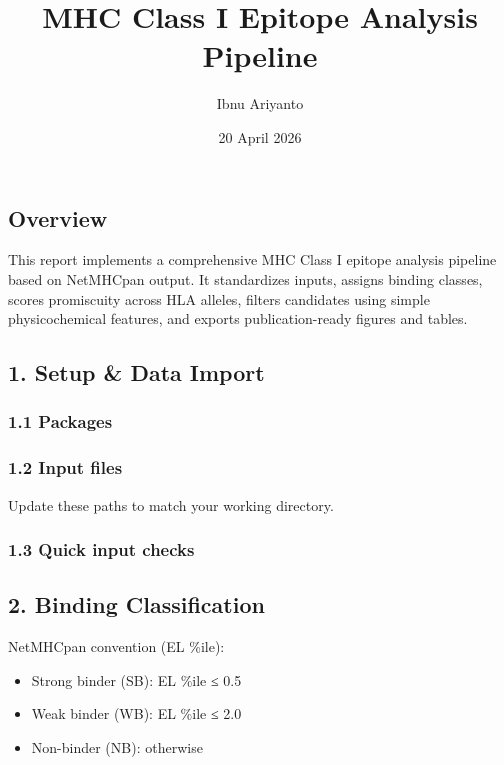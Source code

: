 \documentclass[
]{article}
\title{MHC Class I Epitope Analysis Pipeline}
\author{Ibnu Ariyanto}
\date{20 April 2026}
\providecommand{\tightlist}{%
  \setlength{\itemsep}{0pt}\setlength{\parskip}{0pt}}
\begin{document}
\maketitle

{
\setcounter{tocdepth}{3}
\tableofcontents
}
\subsection{Overview}\label{overview}

This report implements a comprehensive MHC Class I epitope analysis
pipeline based on NetMHCpan output. It standardizes inputs, assigns
binding classes, scores promiscuity across HLA alleles, filters
candidates using simple physicochemical features, and exports
publication-ready figures and tables.

\subsection{1. Setup \& Data Import}\label{setup-data-import}

\subsubsection{1.1 Packages}\label{packages}

\subsubsection{1.2 Input files}\label{input-files}

Update these paths to match your working directory.

\subsubsection{1.3 Quick input checks}\label{quick-input-checks}

\subsection{2. Binding Classification}\label{binding-classification}

NetMHCpan convention (EL \%ile):

\begin{itemize}
\tightlist
\item
  Strong binder (SB): EL \%ile ≤ 0.5
\item
  Weak binder (WB): EL \%ile ≤ 2.0
\item
  Non-binder (NB): otherwise
\end{itemize}
\end{document}
